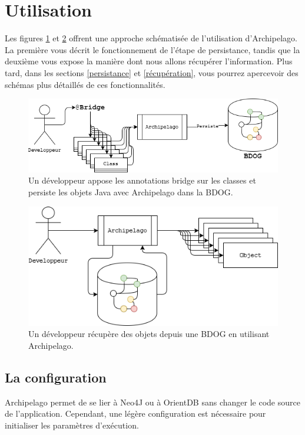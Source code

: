\documentclass[a4paper,fleqn,12pt,oneside]{report}
\begin{document}
\section{Utilisation}
\label{utilisation}
Les figures \ref{fig:HelocoP} et \ref{fig:HelocoG} offrent une approche schématisée de l'utilisation d'Archipelago. 
\\La première vous décrit le fonctionnement de l'étape de persistance, tandis que la deuxième vous expose la manière dont nous allons récupérer l'information. Plus tard, dans les sections \ref{persistance} et \ref{récupération}, vous pourrez apercevoir des schémas plus détaillés de ces fonctionnalités.
\begin{figure}[!ht]
\centering
\includegraphics[scale=0.7]{figures/HelocoP.png}
\caption{Un développeur appose les annotations bridge sur les classes et persiste les objets Java avec Archipelago dans la BDOG.}
\label{fig:HelocoP}
\end{figure}
\begin{figure}[!ht]
\centering
\includegraphics[scale=0.8]{figures/HelocoG.png}
\caption{Un développeur récupère des objets depuis une BDOG en utilisant Archipelago.}
\label{fig:HelocoG}
\end{figure}
\newpage
\label{opérations}
\subsection{La configuration}
\label{configuration}
Archipelago permet de se lier à Neo4J ou à OrientDB sans changer le code source de l'application. 
Cependant, une légère configuration est nécessaire pour initialiser les paramètres d'exécution.
\end{document}
